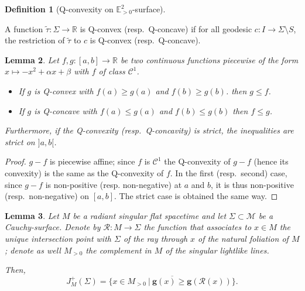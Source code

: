 \documentclass[a4paper,12pt]{article}
\def\M{\mathcal{M}}
\def\R{\mathbb{R}}
\def\E{\mathbf E}
\def\E{\mathbb{E}}
\def\RR{\mathbb{R}}
\def\R{\mathcal R}
\def\quadform{\mathbf{g}}
\def\E{\mathbb{E}}
\def\M{\mathcal M}
\newtheorem{lem}{Lemma}[section]		 %
\theoremstyle{definition}
\newtheorem{defi}[lem]{Definition}	%
\begin{document}
					\begin{defi}[Q-convexity on $\E^2_{>0}$-surface]\label{def:q_convexity_surface}

						A function $\widetilde\tau: \Sigma \rightarrow \RR$ is Q-convex (resp.\ Q-concave) if for all geodesic 
						$c: I \rightarrow \Sigma\setminus S$, the restriction of $\widetilde\tau$ to $c$ is Q-convex (resp.\ Q-concave).
					\end{defi}


					

					\begin{lem}\label{lem:diff_Q_convexe} Let $f,g:[a,b]\rightarrow \RR$ be two continuous functions piecewise of the form $x\mapsto-x^2+\alpha x+\beta$ with $f$ of class $\mathscr C^1$.
					\begin{itemize}
					 \item If $g$ is Q-convex with $f(a)\geq g(a)$ and $f(b)\geq g(b)$. then $g\leq f$.
					 \item If $g$ is Q-concave with $f(a)\leq g(a)$ and $f(b)\leq g(b)$ then $f\leq g$.
					\end{itemize}
					Furthermore, if the Q-convexity (resp.\ Q-concavity) is strict, the inequalities are strict on $]a,b[$.

					
					
					\end{lem}
					\begin{proof} $g-f$ is piecewise affine; since $f$ is $\mathscr C^1$ the Q-convexity of $g-f$ (hence its convexity) is the same as the Q-convexity of $f$. In the first (resp.\ second) case, since $g-f$ is non-positive (resp. non-negative)  at $a$ and $b$, it is thus non-positive (resp.\ non-negative) on $[a,b]$. The strict case is obtained the same way.
					\end{proof}
\begin{lem}\label{lem:future_radiant} Let $M$ be a radiant singular flat spacetime and let $\Sigma\subset \M$ be a Cauchy-surface. Denote by $\R:M\rightarrow \Sigma$ the function that associates to $x\in M$ the unique intersection point with $\Sigma$ of the ray through $x$ of the natural foliation of $M$; denote as well $M_{>0}$ the complement in $M$ of the singular lightlike lines.
		
		Then, 
		$$J^+_M(\Sigma) = \overline{\{x\in M_{>0}~|~ \quadform(x)\geq \quadform(\R(x))\}}.$$ 
		\end{lem}
\end{document}

